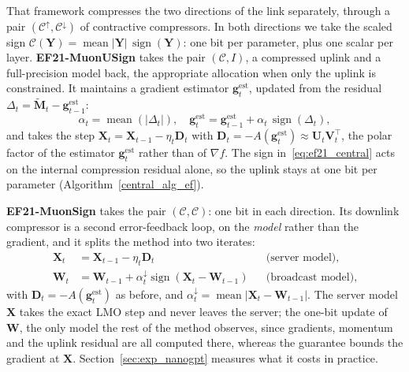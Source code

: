 That framework compresses the two directions of the link separately, through a pair $(\mathcal{C}^{\uparrow},\mathcal{C}^{\downarrow})$ of contractive compressors. In both directions we take the scaled sign $\mathcal{C}(\mathbf{Y}) = \operatorname{mean}|\mathbf{Y}|\,\operatorname{sign}(\mathbf{Y})$: one bit per parameter, plus one scalar per layer. \textbf{EF21-MuonUSign} takes the pair $(\mathcal{C},I)$, a compressed uplink and a full-precision model back, the appropriate allocation when only the uplink is constrained. It maintains a gradient estimator $\mathbf{g}_t^{\mathrm{est}}$, updated from the residual $\Delta_t = \tilde{\mathbf{M}}_t - \mathbf{g}_{t-1}^{\mathrm{est}}$:
\begin{equation}
\alpha_t = \operatorname{mean}(|\Delta_t|),\quad
\mathbf{g}_{t}^{\mathrm{est}} = \mathbf{g}_{t-1}^{\mathrm{est}} + \alpha_t\,\operatorname{sign}(\Delta_t),
\label{eq:ef21_central}
\end{equation}
and takes the step $\mathbf{X}_{t} = \mathbf{X}_{t-1} - \eta_t\mathbf{D}_t$ with $\mathbf{D}_t = -A(\mathbf{g}_{t}^{\mathrm{est}}) \approx \mathbf{U}_{t}\mathbf{V}^\top_{t}$, the polar factor of the estimator $\mathbf{g}_t^{\mathrm{est}}$ rather than of $\nabla f$. The sign in~\eqref{eq:ef21_central} acts on the internal compression residual alone, so the uplink stays at one bit per parameter (Algorithm~\ref{central_alg_ef}).

\textbf{EF21-MuonSign} takes the pair $(\mathcal{C},\mathcal{C})$: one bit in each direction. Its downlink compressor is a second error-feedback loop, on the \emph{model} rather than the gradient, and it splits the method into two iterates:
\begin{equation}\label{eq:two_models}
\begin{aligned}
  \mathbf{X}_{t}&=\mathbf{X}_{t-1}-\eta_t\mathbf{D}_t &&\text{(server model)},\\
  \mathbf{W}_{t}&=\mathbf{W}_{t-1}+\alpha_t^{\downarrow}\operatorname{sign}(\mathbf{X}_{t}-\mathbf{W}_{t-1}) &&\text{(broadcast model)},
\end{aligned}
\end{equation}
with $\mathbf{D}_t=-A(\mathbf{g}_{t}^{\mathrm{est}})$ as before, and $\alpha_t^{\downarrow}=\operatorname{mean}|\mathbf{X}_t-\mathbf{W}_{t-1}|$. The server model $\mathbf{X}$ takes the exact LMO step and never leaves the server;  the one-bit update of $\mathbf{W}$, the only model the rest of the method observes, since gradients, momentum and the uplink residual are all computed there, whereas the guarantee bounds the gradient at $\mathbf{X}$.  Section~\ref{sec:exp_nanogpt} measures what it costs in practice.

